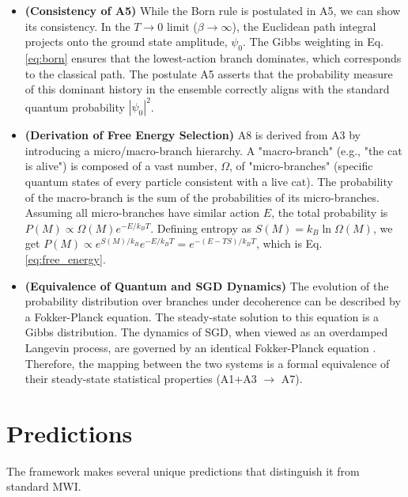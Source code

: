 \documentclass[aps,prl,twocolumn,superscriptaddress,longbibliography]{revtex4-2}
\begin{document}
\begin{itemize}
    \item[\textbf{D1}] \textbf{(Consistency of A5)} While the Born rule is postulated in A5, we can show its consistency. In the $T \to 0$ limit ($\beta \to \infty$), the Euclidean path integral projects onto the ground state amplitude, $\psi_0$. The Gibbs weighting in Eq. \ref{eq:born} ensures that the lowest-action branch dominates, which corresponds to the classical path. The postulate A5 asserts that the probability measure of this dominant history in the ensemble correctly aligns with the standard quantum probability $|\psi_0|^2$.

    \item[\textbf{D2}] \textbf{(Derivation of Free Energy Selection)} A8 is derived from A3 by introducing a micro/macro-branch hierarchy. A "macro-branch" (e.g., "the cat is alive") is composed of a vast number, $\Omega$, of "micro-branches" (specific quantum states of every particle consistent with a live cat). The probability of the macro-branch is the sum of the probabilities of its micro-branches. Assuming all micro-branches have similar action $E$, the total probability is $P(M) \propto \Omega(M) e^{-E/k_B T}$. Defining entropy as $S(M) = k_B \ln \Omega(M)$, we get $P(M) \propto e^{S(M)/k_B} e^{-E/k_B T} = e^{-(E-TS)/k_B T}$, which is Eq. \ref{eq:free_energy}.

    \item[\textbf{D3}] \textbf{(Equivalence of Quantum and SGD Dynamics)} The evolution of the probability distribution over branches under decoherence can be described by a Fokker-Planck equation. The steady-state solution to this equation is a Gibbs distribution. The dynamics of SGD, when viewed as an overdamped Langevin process, are governed by an identical Fokker-Planck equation \cite{Chaudhari2018}. Therefore, the mapping between the two systems is a formal equivalence of their steady-state statistical properties (A1+A3 $\to$ A7).
\end{itemize}

\section{Predictions}

The framework makes several unique predictions that distinguish it from standard MWI.
\end{document}
